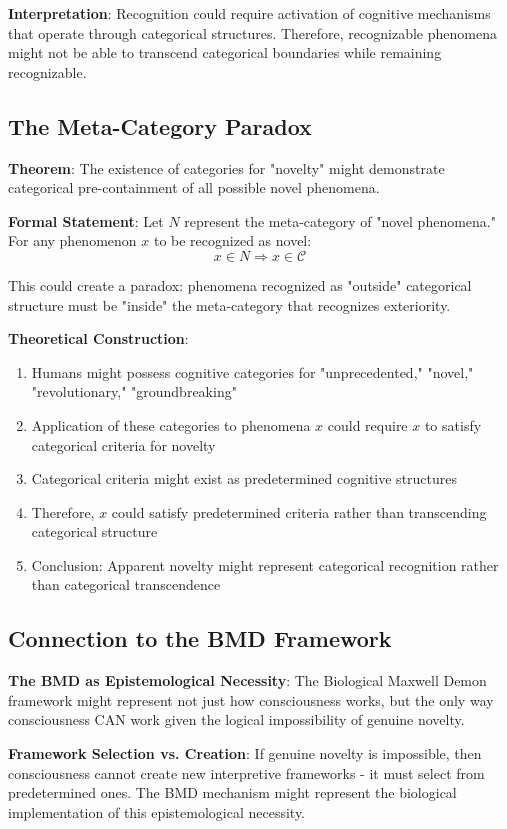 \documentclass[12pt]{article}
\begin{document}
\textbf{Interpretation}: Recognition could require activation of cognitive mechanisms that operate through categorical structures. Therefore, recognizable phenomena might not be able to transcend categorical boundaries while remaining recognizable.

\subsection{The Meta-Category Paradox}

\textbf{Theorem}: The existence of categories for "novelty" might demonstrate categorical pre-containment of all possible novel phenomena.

\textbf{Formal Statement}: Let $N$ represent the meta-category of "novel phenomena." For any phenomenon $x$ to be recognized as novel:
$$x \in N \Rightarrow x \in \mathcal{C}$$

This could create a paradox: phenomena recognized as "outside" categorical structure must be "inside" the meta-category that recognizes exteriority.

\textbf{Theoretical Construction}:
\begin{enumerate}
\item Humans might possess cognitive categories for "unprecedented," "novel," "revolutionary," "groundbreaking"
\item Application of these categories to phenomena $x$ could require $x$ to satisfy categorical criteria for novelty
\item Categorical criteria might exist as predetermined cognitive structures
\item Therefore, $x$ could satisfy predetermined criteria rather than transcending categorical structure
\item Conclusion: Apparent novelty might represent categorical recognition rather than categorical transcendence
\end{enumerate}

\subsection{Connection to the BMD Framework}

\textbf{The BMD as Epistemological Necessity}: The Biological Maxwell Demon framework might represent not just how consciousness works, but the only way consciousness CAN work given the logical impossibility of genuine novelty.

\textbf{Framework Selection vs. Creation}: If genuine novelty is impossible, then consciousness cannot create new interpretive frameworks - it must select from predetermined ones. The BMD mechanism might represent the biological implementation of this epistemological necessity.
\end{document}
